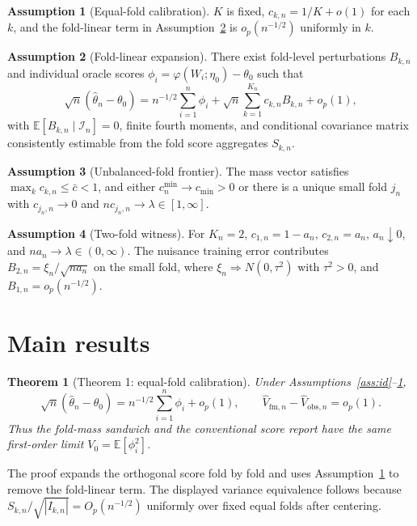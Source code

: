 \documentclass[11pt]{article}
\newcommand{\E}{\mathbb{E}}
\theoremstyle{definition}
\newtheorem{assumption}{Assumption}
\theoremstyle{plain}
\newtheorem{theorem}{Theorem}
\theoremstyle{remark}
\begin{document}
\begin{assumption}[Equal-fold calibration]\label{ass:equal}
\(K\) is fixed, \(c_{k,n}=1/K+o(1)\) for each \(k\), and the fold-linear term in Assumption~\ref{ass:foldlinear} is \(o_p(n^{-1/2})\) uniformly in \(k\).
\end{assumption}

\begin{assumption}[Fold-linear expansion]\label{ass:foldlinear}
There exist fold-level perturbations \(B_{k,n}\) and individual oracle scores \(\phi_i=\varphi(W_i;\eta_0)-\theta_0\) such that
\[
\sqrt n(\hat\theta_n-\theta_0)=n^{-1/2}\sum_{i=1}^n\phi_i+\sqrt n\sum_{k=1}^{K_n}c_{k,n}B_{k,n}+o_p(1),
\]
with \(\E[B_{k,n}\mid \mathcal I_n]=0\), finite fourth moments, and conditional covariance matrix consistently estimable from the fold score aggregates \(S_{k,n}\).
\end{assumption}

\begin{assumption}[Unbalanced-fold frontier]\label{ass:frontier}
The mass vector satisfies \(\max_k c_{k,n}\le \bar c<1\), and either \(c_n^{\min}\to c_{\min}>0\) or there is a unique small fold \(j_n\) with \(c_{j_n,n}\to0\) and \(n c_{j_n,n}\to\lambda\in[1,\infty]\).
\end{assumption}

\begin{assumption}[Two-fold witness]\label{ass:witness}
For \(K_n=2\), \(c_{1,n}=1-a_n\), \(c_{2,n}=a_n\), \(a_n\downarrow0\), and \(n a_n\to\lambda\in(0,\infty)\). The nuisance training error contributes \(B_{2,n}=\xi_n/\sqrt{n a_n}\) on the small fold, where \(\xi_n\Rightarrow N(0,\tau^2)\) with \(\tau^2>0\), and \(B_{1,n}=o_p(n^{-1/2})\).
\end{assumption}

\section{Main results}
\begin{theorem}[Theorem 1: equal-fold calibration]\label{thm:equal}
Under Assumptions~\ref{ass:id}--\ref{ass:equal},
\[
\sqrt n(\hat\theta_n-\theta_0)=n^{-1/2}\sum_{i=1}^n\phi_i+o_p(1),\qquad
\hat V_{\mathrm{fm},n}-\hat V_{\mathrm{obs},n}=o_p(1).
\]
Thus the fold-mass sandwich and the conventional score report have the same first-order limit \(V_0=\E[\phi_i^2]\).
\end{theorem}
The proof expands the orthogonal score fold by fold and uses Assumption~\ref{ass:equal} to remove the fold-linear term. The displayed variance equivalence follows because \(S_{k,n}/\sqrt{|I_{k,n}|}=O_p(n^{-1/2})\) uniformly over fixed equal folds after centering.
\end{document}
